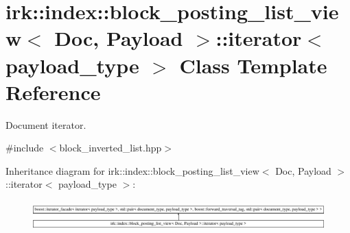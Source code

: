 \hypertarget{classirk_1_1index_1_1block__posting__list__view_1_1iterator}{}\section{irk\+:\+:index\+:\+:block\+\_\+posting\+\_\+list\+\_\+view$<$ Doc, Payload $>$\+:\+:iterator$<$ payload\+\_\+type $>$ Class Template Reference}
\label{classirk_1_1index_1_1block__posting__list__view_1_1iterator}


Document iterator.  




{\ttfamily \#include $<$block\+\_\+inverted\+\_\+list.\+hpp$>$}

Inheritance diagram for irk\+:\+:index\+:\+:block\+\_\+posting\+\_\+list\+\_\+view$<$ Doc, Payload $>$\+:\+:iterator$<$ payload\+\_\+type $>$\+:\begin{figure}[H]
\begin{center}
\leavevmode
\includegraphics[height=1.154639cm]{classirk_1_1index_1_1block__posting__list__view_1_1iterator}
\end{center}
\end{figure}

